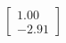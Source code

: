 \documentclass[preview]{standalone}
\begin{document}
\begin{align*}
\begin{bmatrix} 1.00 \\ -2.91 \end{bmatrix}
\end{align*}
\end{document}
